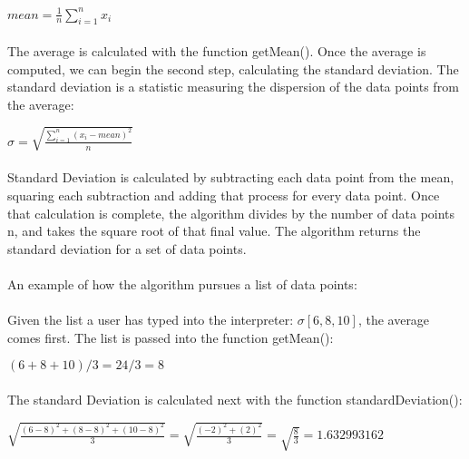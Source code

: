 \begin{itemize}
            \begin{center}
                $mean = \frac{1}{n}\sum_{i=1}^{n}x_i$
            \end{center}

            \paragraph{}
            The average is calculated with the function getMean(). Once the average is computed, we can begin the second step, calculating the standard deviation. The standard deviation is a statistic measuring the dispersion of the data points from the average:

            \begin{center}
                $\sigma = \sqrt{\frac{\sum_{i=1}^{n}(x_i - mean)^2}{n}}$
            \end{center}

            \paragraph{}
            Standard Deviation is calculated by subtracting each data point from the mean, squaring each subtraction and adding that process for every data point. Once that calculation is complete, the algorithm divides by the number of data points n, and takes the square root of that final value. The algorithm returns the standard deviation for a set of data points.

            \paragraph{}
            An example of how the algorithm pursues a list of data points:

            \paragraph{}
            Given the list a user has typed into the interpreter: $\sigma[6, 8, 10]$, the average comes first. The list is passed into the function getMean():

            \begin{center}
                $(6 + 8 + 10)/3 = 24/3 = 8$
            \end{center}

            \paragraph{}
            The standard Deviation is calculated next with the function standardDeviation():
            \begin{center}
                $\sqrt{\frac{(6-8)^2 + (8-8)^2 + (10-8)^2}{3}} = \sqrt{\frac{(-2)^2+(2)^2}{3}} = \sqrt{\frac{8}{3}} = 1.632993162$
            \end{center}


\end{itemize}
